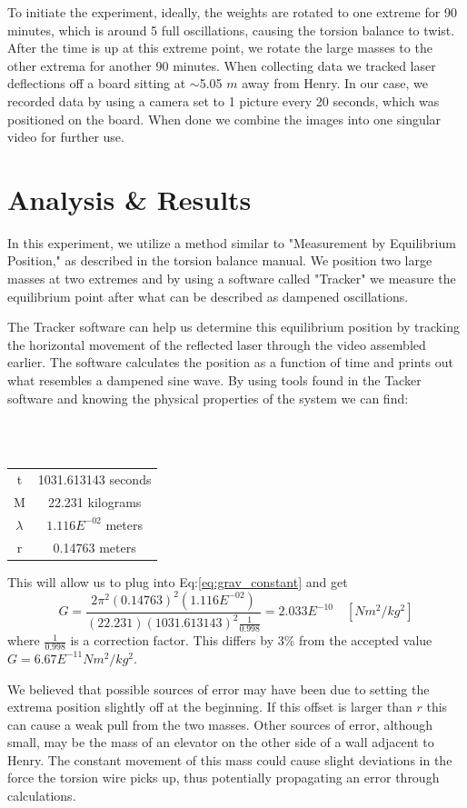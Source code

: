 \documentclass[a4paper,12pt,english]{all-in-one} %
\begin{document}
{To initiate the experiment, ideally, the weights are rotated to one extreme for 90 minutes, which is around 5 full oscillations, causing the torsion balance to twist. After the time is up at this extreme point, we rotate the large masses to the other extrema for another 90 minutes. When collecting data we tracked laser deflections off a board sitting at $\sim$5.05 $m$ away from Henry. In our case, we recorded data by using a camera set to 1 picture every 20 seconds, which was positioned on the board. When done we combine the images into one singular video for further use.
}

\section*{Analysis \& Results}
{
In this experiment, we utilize a method similar to "Measurement by Equilibrium Position," as described in the torsion balance manual. We position two large masses at two extremes and by using a software called "Tracker" we measure the equilibrium point after what can be described as dampened oscillations. 

The Tracker software can help us determine this equilibrium position by tracking the horizontal movement of the reflected laser through the video assembled earlier. The software calculates the position as a function of time and prints out what resembles a dampened sine wave. By using tools found in the Tacker software and knowing the physical properties of the system we can find:

\noindent
\\
\\
\begin{center}
    {\begin{tabular}{c|c} \label{7-prop}
t & 1031.613143 seconds \\
M & 22.231 kilograms \\
$\lambda$ & $1.116E^{-02}$ meters \\
r & 0.14763 meters \\
\end{tabular}}
\end{center}

\noindent
This will allow us to plug into Eq:\eqref{eq:grav_constant} and get 
\begin{equation}\label{eq:grav_constant_plus_constant}
   G = \frac{2\pi^2(0.14763)^2(1.116E^{-02})}{(22.231)(1031.613143)^2\frac{1}{0.998}} = 2.033E^{-10} \quad [Nm^2/kg^2]
\end{equation}
where $\frac{1}{0.998}$ is a correction factor. This differs by 3\% from the accepted value $G = 6.67E^{-11} Nm^2/kg^2$. 

We believed that possible sources of error may have been due to setting the extrema position slightly off at the beginning. If this offset is larger than $r$ this can cause a weak pull from the two masses. Other sources of error, although small, may be the mass of an elevator on the other side of a wall adjacent to Henry. The constant movement of this mass could cause slight deviations in the force the torsion wire picks up, thus potentially propagating an error through calculations. 

}
\end{document}
